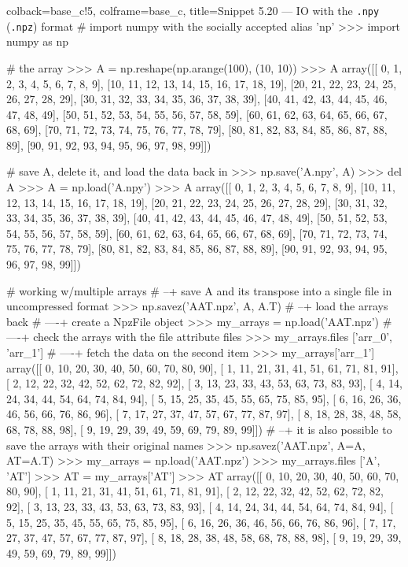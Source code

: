 \documentclass[a4paper,11pt]{book}
\begin{document}
\begin{pythoncode}[linenos=true,]{colback=base_c!5, colframe=base_c, title=\sffamily Snippet 5.20 --- IO with the \texttt{.npy} (\texttt{.npz}) format}
# import numpy with the socially accepted alias 'np'
>>> import numpy as np

# the array
>>> A = np.reshape(np.arange(100), (10, 10))
>>> A
array([[ 0,  1,  2,  3,  4,  5,  6,  7,  8,  9],
       [10, 11, 12, 13, 14, 15, 16, 17, 18, 19],
       [20, 21, 22, 23, 24, 25, 26, 27, 28, 29],
       [30, 31, 32, 33, 34, 35, 36, 37, 38, 39],
       [40, 41, 42, 43, 44, 45, 46, 47, 48, 49],
       [50, 51, 52, 53, 54, 55, 56, 57, 58, 59],
       [60, 61, 62, 63, 64, 65, 66, 67, 68, 69],
       [70, 71, 72, 73, 74, 75, 76, 77, 78, 79],
       [80, 81, 82, 83, 84, 85, 86, 87, 88, 89],
       [90, 91, 92, 93, 94, 95, 96, 97, 98, 99]])

# save A, delete it, and load the data back in
>>> np.save('A.npy', A)
>>> del A
>>> A = np.load('A.npy')
>>> A
array([[ 0,  1,  2,  3,  4,  5,  6,  7,  8,  9],
       [10, 11, 12, 13, 14, 15, 16, 17, 18, 19],
       [20, 21, 22, 23, 24, 25, 26, 27, 28, 29],
       [30, 31, 32, 33, 34, 35, 36, 37, 38, 39],
       [40, 41, 42, 43, 44, 45, 46, 47, 48, 49],
       [50, 51, 52, 53, 54, 55, 56, 57, 58, 59],
       [60, 61, 62, 63, 64, 65, 66, 67, 68, 69],
       [70, 71, 72, 73, 74, 75, 76, 77, 78, 79],
       [80, 81, 82, 83, 84, 85, 86, 87, 88, 89],
       [90, 91, 92, 93, 94, 95, 96, 97, 98, 99]])

# working w/multiple arrays
# --+ save A and its transpose into a single file in uncompressed format
>>> np.savez('AAT.npz', A, A.T)
# --+ load the arrays back
# ----+ create a NpzFile object
>>> my_arrays = np.load('AAT.npz')
# ----+ check the arrays with the file attribute files
>>> my_arrays.files
['arr_0', 'arr_1']
# ----+ fetch the data on the second item 
>>> my_arrays['arr_1']
array([[ 0, 10, 20, 30, 40, 50, 60, 70, 80, 90],
       [ 1, 11, 21, 31, 41, 51, 61, 71, 81, 91],
       [ 2, 12, 22, 32, 42, 52, 62, 72, 82, 92],
       [ 3, 13, 23, 33, 43, 53, 63, 73, 83, 93],
       [ 4, 14, 24, 34, 44, 54, 64, 74, 84, 94],
       [ 5, 15, 25, 35, 45, 55, 65, 75, 85, 95],
       [ 6, 16, 26, 36, 46, 56, 66, 76, 86, 96],
       [ 7, 17, 27, 37, 47, 57, 67, 77, 87, 97],
       [ 8, 18, 28, 38, 48, 58, 68, 78, 88, 98],
       [ 9, 19, 29, 39, 49, 59, 69, 79, 89, 99]])
# --+ it is also possible to save the arrays with their original names
>>> np.savez('AAT.npz', A=A, AT=A.T)
>>> my_arrays = np.load('AAT.npz')
>>> my_arrays.files
['A', 'AT']
>>> AT = my_arrays['AT']
>>> AT
array([[ 0, 10, 20, 30, 40, 50, 60, 70, 80, 90],
       [ 1, 11, 21, 31, 41, 51, 61, 71, 81, 91],
       [ 2, 12, 22, 32, 42, 52, 62, 72, 82, 92],
       [ 3, 13, 23, 33, 43, 53, 63, 73, 83, 93],
       [ 4, 14, 24, 34, 44, 54, 64, 74, 84, 94],
       [ 5, 15, 25, 35, 45, 55, 65, 75, 85, 95],
       [ 6, 16, 26, 36, 46, 56, 66, 76, 86, 96],
       [ 7, 17, 27, 37, 47, 57, 67, 77, 87, 97],
       [ 8, 18, 28, 38, 48, 58, 68, 78, 88, 98],
       [ 9, 19, 29, 39, 49, 59, 69, 79, 89, 99]])

\end{pythoncode}
\end{document}
